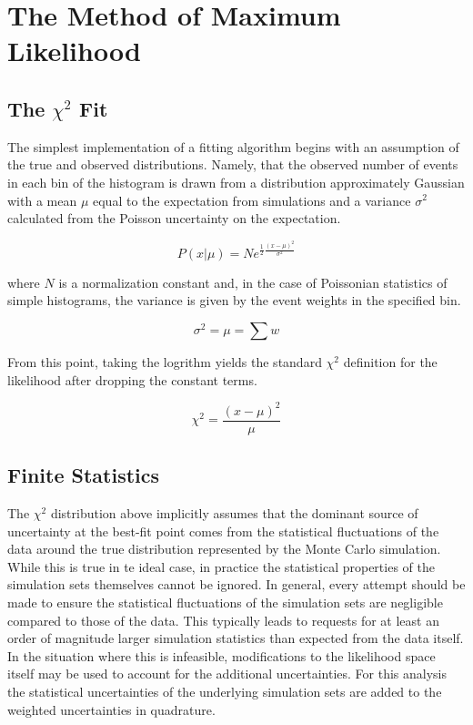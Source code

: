 \label{sec:likelihoods}
\section{The Method of Maximum Likelihood}

\label{subsec:chi2}
\subsection{The $\chi^2$ Fit}
The simplest implementation of a fitting algorithm begins with an assumption of the true and observed distributions.
Namely, that the observed number of events in each bin of the histogram is drawn from a distribution approximately Gaussian with a mean $\mu$ equal to the expectation from simulations and a variance $\sigma^2$ calculated from the Poisson uncertainty on the expectation. 

\begin{equation}
	P\left(x|\mu\right) = N e^{\frac{1}{2}\frac{\left(x-\mu\right)^2}{\sigma^2}}
\end{equation}

where $N$ is a normalization constant and, in the case of Poissonian statistics of simple histograms, the variance is given by the event weights in the specified bin.

\begin{equation}
	\sigma^2 = \mu = \sum{w}
\end{equation}

From this point, taking the logrithm yields the standard $\chi^2$ definition for the likelihood after dropping the constant terms.

\begin{equation}
	\chi^2 = \frac{\left(x-\mu\right)^2}{\mu}
\end{equation}	

\label{subsec:finite_stats}
\subsection{Finite Statistics}
The $\chi^2$ distribution above implicitly assumes that the dominant source of uncertainty at the best-fit point comes from the statistical fluctuations of the data around the true distribution represented by the Monte Carlo simulation.
While this is true in te ideal case, in practice the statistical properties of the simulation sets themselves cannot be ignored.
In general, every attempt should be made to ensure the statistical fluctuations of the simulation sets are negligible compared to those of the data.
This typically leads to requests for at least an order of magnitude larger simulation statistics than expected from the data itself.
In the situation where this is infeasible, modifications to the likelihood space itself may be used to account for the additional uncertainties.
For this analysis the statistical uncertainties of the underlying simulation sets are added to the weighted uncertainties in quadrature.

